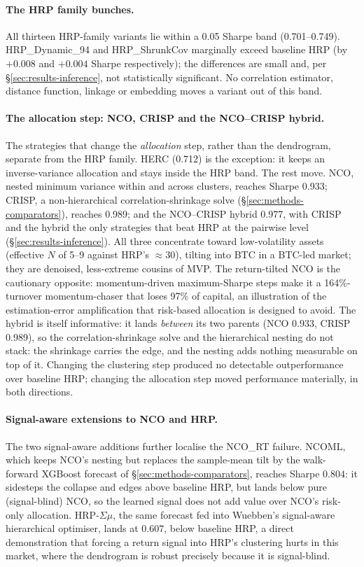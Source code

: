 \documentclass[11pt,a4paper]{article}
\begin{document}
\paragraph{The HRP family bunches.} All thirteen HRP-family variants lie
within a 0.05 Sharpe band (0.701--0.749). HRP\_Dynamic\_94 and
HRP\_ShrunkCov marginally exceed baseline HRP (by $+0.008$ and $+0.004$
Sharpe respectively); the differences are small and, per
\S\ref{sec:results-inference}, not statistically significant. No
correlation estimator, distance function, linkage or embedding moves a
variant out of this band.

\paragraph{The allocation step: NCO, CRISP and the NCO--CRISP hybrid.}
The strategies that change the \emph{allocation} step, rather than the
dendrogram, separate from the HRP family. HERC (0.712) is the
exception: it keeps an inverse-variance allocation and stays inside the
HRP band. The rest move. NCO, nested minimum variance within and
across clusters, reaches Sharpe 0.933; CRISP, a non-hierarchical
correlation-shrinkage solve (\S\ref{sec:methods-comparators}), reaches
0.989; and the NCO--CRISP hybrid 0.977, with CRISP and the hybrid the
only strategies that beat HRP at the pairwise level
(\S\ref{sec:results-inference}). All three concentrate toward
low-volatility assets (effective $N$ of 5--9 against HRP's
$\approx30$), tilting into BTC in a BTC-led market; they are denoised,
less-extreme cousins of MVP. The return-tilted NCO is the cautionary
opposite: momentum-driven maximum-Sharpe steps make it a
164\%-turnover momentum-chaser that loses 97\% of capital, an
illustration of the estimation-error amplification that risk-based
allocation is designed to avoid. The hybrid is itself informative: it lands \emph{between} its two parents (NCO 0.933, CRISP 0.989), so
the correlation-shrinkage solve and the hierarchical nesting do not
stack: the shrinkage carries the edge, and the nesting adds nothing
measurable on top of it. Changing the clustering step produced no
detectable outperformance over baseline HRP; changing the allocation
step moved performance materially, in both directions.

\paragraph{Signal-aware extensions to NCO and HRP.} The two
signal-aware additions further localise the NCO\_RT failure. NCOML,
which keeps NCO's nesting but replaces the sample-mean tilt by the
walk-forward XGBoost forecast of \S\ref{sec:methods-comparators},
reaches Sharpe $0.804$: it sidesteps the collapse and edges above
baseline HRP, but lands below pure (signal-blind) NCO, so the learned
signal does not add value over NCO's risk-only allocation.
HRP-$\Sigma\mu$, the same forecast fed into Wuebben's signal-aware
hierarchical optimiser, lands at $0.607$, below baseline HRP, a direct
demonstration that forcing a return signal into HRP's clustering hurts
in this market, where the dendrogram is robust precisely because it
is signal-blind.
\end{document}
